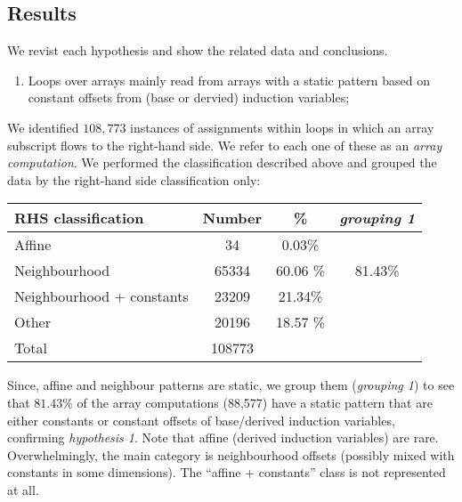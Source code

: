 \subsection{Results}

\noindent
We revist each hypothesis and show the related data and conclusions.
%
\begin{enumerate}
\item Loops over arrays mainly read from arrays with a static pattern
based on constant offsets from (base or dervied) induction variables;
\end{enumerate}
%
We identified $108,773$ instances of assignments within loops in
which an array subscript flows to the right-hand side. We refer
to each one of these as an \emph{array computation}.
We performed the classification described above
and grouped the data by the right-hand side classification only:
\begin{center}
\begin{tabular}{lS[table-format=4]@{\extracolsep{5pt}}S[table-format=2.2]c}
\textbf{RHS classification} & \textbf{Number} & \% &
\textit{grouping 1} \\ \hline
Affine                          & 34        & 0.03\%
&  \\ 
Neighbourhood                   & 65334     & 60.06 \%  \\ 
Neighbourhood + constants       & 23209     & 21.34\%  \\ \hline
Other                           & 20196     & 18.57 \%  \\ \hline \hline
Total                           & 108773    &  \\
\end{tabular}
\end{center}
%
\noindent
Since, affine and neighbour patterns are static, we
group them (\textit{grouping 1}) to see that $81.43\%$ of the array
computations (88,577) have a static pattern that are either constants or
constant offsets of base/derived induction variables, confirming
\emph{hypothesis 1}. Note that affine (derived induction variables)
are rare. Overwhelmingly, the main category is neighbourhood
offsets (possibly mixed with constants in some
dimensions). The ``affine + constants'' class is
not represented at all.
